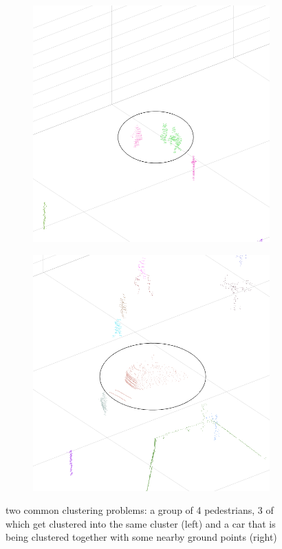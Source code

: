 \begin{figure}[H]
\centering
\begin{subfigure}{.5\textwidth}
  \centering
  \includegraphics[width=1.0\linewidth]{include/images/clustering_problems_1.png}
\end{subfigure}%
\begin{subfigure}{.5\textwidth}
  \centering
  \includegraphics[width=1.0\linewidth]{include/images/clustering_problems_2.png}
\end{subfigure}
\caption{two common clustering problems: a group of 4 pedestrians, 3 of which get clustered into the same cluster (left) and a car that is being clustered together with some nearby ground points (right)}
\label{fig:clustering_problems}
\end{figure}


